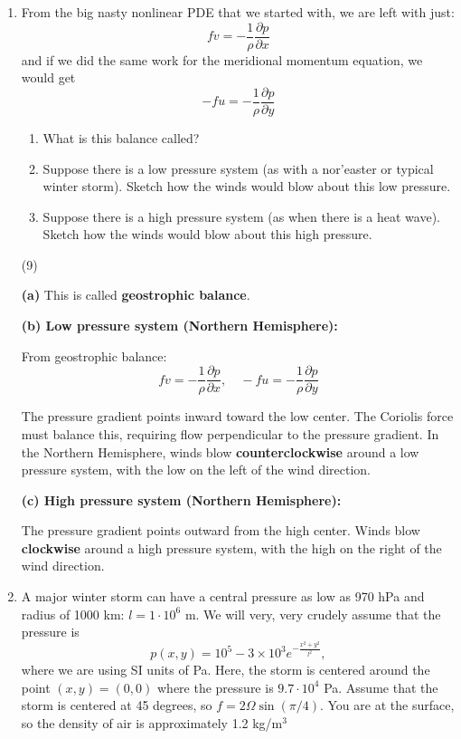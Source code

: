 \documentclass[letterpaper, 11pt]{article}
\newcommand{\1}{\mathds{1}}	%
\theoremstyle{definition}
\begin{document}
\begin{enumerate}[resume]
(8)
With $t = T\hat{t}$ and $T = L/U$:
\[
\frac{\partial u}{\partial t} \sim \frac{U}{T} = \frac{U}{L/U} = \frac{U^2}{L}
\]

This scales the same as the nonlinear terms: $\boxed{\frac{U^2}{L}}$.

When $Ro \ll 1$, both the time derivative and nonlinear terms are negligible compared to the Coriolis term, leaving a steady balance.


\item From the big nasty nonlinear PDE that we started with, we are left with just:
\[
fv = -\frac{1}{\rho}\frac{\partial p}{\partial x}
\]
and if we did the same work for the meridional momentum equation, we would get
\[
-fu = -\frac{1}{\rho}\frac{\partial p}{\partial y}
\]

\begin{enumerate}[label=(\alph*)]
\item What is this balance called?
\item Suppose there is a low pressure system (as with a nor'easter or typical winter storm). Sketch how the winds would blow about this low pressure.
\item Suppose there is a high pressure system (as when there is a heat wave). Sketch how the winds would blow about this high pressure.
\end{enumerate}

(9)

\textbf{(a)} This is called \textbf{geostrophic balance}.

\textbf{(b) Low pressure system (Northern Hemisphere):}

From geostrophic balance:
\[
fv = -\frac{1}{\rho}\frac{\partial p}{\partial x}, \quad -fu = -\frac{1}{\rho}\frac{\partial p}{\partial y}
\]

The pressure gradient points inward toward the low center. The Coriolis force must balance this, requiring flow perpendicular to the pressure gradient. In the Northern Hemisphere, winds blow \textbf{counterclockwise} around a low pressure system, with the low on the left of the wind direction.

\textbf{(c) High pressure system (Northern Hemisphere):}

The pressure gradient points outward from the high center. Winds blow \textbf{clockwise} around a high pressure system, with the high on the right of the wind direction.

\item A major winter storm can have a central pressure as low as 970 hPa and radius of 1000 km: $l = 1 \cdot 10^6$ m. We will very, very crudely assume that the pressure is
\[
p(x, y) = 10^5 - 3 \times 10^3 e^{-\frac{x^2+y^2}{l^2}},
\]
where we are using SI units of Pa. Here, the storm is centered around the point $(x, y) = (0, 0)$ where the pressure is $9.7 \cdot 10^4$ Pa. Assume that the storm is centered at 45 degrees, so $f = 2\Omega\sin(\pi/4)$. You are at the surface, so the density of air is approximately 1.2 kg/m$^3$


\end{enumerate}
\end{document}
